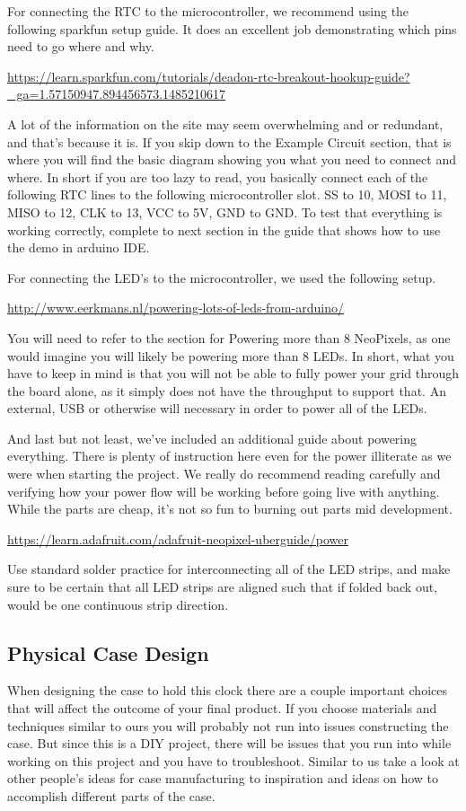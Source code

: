 \documentclass[onecolumn, draftclsnofoot,10pt, compsoc]{IEEEtran}
\begin{document}
For connecting the RTC to the microcontroller, we recommend using the following sparkfun setup guide.
It does an excellent job demonstrating which pins need to go where and why.

\url{https://learn.sparkfun.com/tutorials/deadon-rtc-breakout-hookup-guide?_ga=1.57150947.894456573.1485210617}

A lot of the information on the site may seem overwhelming and or redundant, and that's because it is.
If you skip down to the Example Circuit section, that is where you will find the basic diagram showing you what you need to connect and where.
In short if you are too lazy to read, you basically connect each of the following RTC lines to the following microcontroller slot.
SS to 10, MOSI to 11, MISO to 12, CLK to 13, VCC to 5V, GND to GND.
To test that everything is working correctly, complete to next section in the guide that shows how to use the demo in arduino IDE.

For connecting the LED's to the microcontroller, we used the following setup.

\url{http://www.eerkmans.nl/powering-lots-of-leds-from-arduino/}

You will need to refer to the section for Powering more than 8 NeoPixels, as one would imagine you will likely be powering more than 8 LEDs.
In short, what you have to keep in mind is that you will not be able to fully power your grid through the board alone, as it simply does not have the throughput to support that.
An external, USB or otherwise will necessary in order to power all of the LEDs.

And last but not least, we've included an additional guide about powering everything.
There is plenty of instruction here even for the power illiterate as we were when starting the project.
We really do recommend reading carefully and verifying how your power flow will be working before going live with anything.
While the parts are cheap, it's not so fun to burning out parts mid development.

\url{https://learn.adafruit.com/adafruit-neopixel-uberguide/power}

Use standard solder practice for interconnecting all of the LED strips, and make sure to be certain that all LED strips are aligned such that if folded back out, would be one continuous strip direction.


\subsection{Physical Case Design}
When designing the case to hold this clock there are a couple important choices that will affect the outcome of your final product.
If you choose materials and techniques similar to ours you will probably not run into issues constructing the case.
But since this is a DIY project, there will be issues that you run into while working on this project and you have to troubleshoot.
Similar to us take a look at other people's ideas for case manufacturing to inspiration and ideas on how to accomplish different parts of the case.
\end{document}

